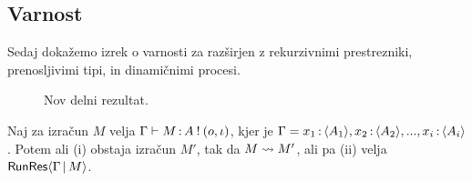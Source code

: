 \subsection{Varnost}

Sedaj dokažemo izrek o varnosti za \lae{} razširjen z rekurzivnimi prestrezniki, prenosljivimi tipi, in dinamičnimi procesi.


\begin{figure}[H]
	\centering
	\begin{mathpar}
	\end{mathpar}
	

	\caption{Nov delni rezultat.}
	\label{fig:results-rules-2}
\end{figure}



\begin{trditev}[o napredku]\label{trd:gamma-napredek-2}
	Naj za izračun $M$ velja $\Gamma \types M \of \tycomp{A}{\o, \i}$, kjer je $\Gamma = x_1 \of \typromise{A_1}, x_2 \of \typromise{A_2},..., x_i \of \typromise{A_i}$. Potem ali (i) obstaja izračun $M'$, tak da $M \reduces M'$, ali pa (ii) velja $\RunResult{\Gamma}{M}$.
\end{trditev}

